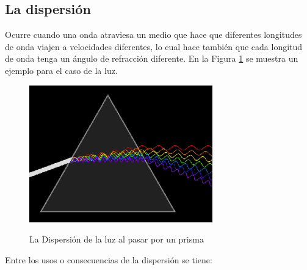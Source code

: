 \subsection{La dispersión}
Ocurre cuando una onda atraviesa un medio que hace que diferentes longitudes de onda viajen a velocidades diferentes, lo cual hace también que cada longitud de onda tenga un ángulo de refracción diferente. En la Figura \ref{fig:Trian} se muestra un ejemplo para el caso de la luz. \\

\vspace{200px}
\begin{figure}[h!]
	\captionsetup{justification = raggedright, singlelinecheck = false}
	\caption{La Dispersión de la luz al pasar por un prisma} 
	\centering
	\includegraphics[scale=1]{Imagenes/Trian.png}
	\label{fig:Trian}
\end{figure}

Entre los usos o consecuencias de la dispersión se tiene: \\

